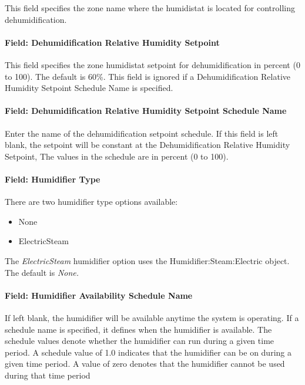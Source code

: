 This field specifies the zone name where the humidistat is located for controlling dehumidification.

\paragraph{Field: Dehumidification Relative Humidity Setpoint}\label{field-dehumidification-relative-humidity-setpoint-1}

This field specifies the zone humidistat setpoint for dehumidification in percent (0 to 100). The default is 60\%. This field is ignored if a Dehumidification Relative Humidity Setpoint Schedule Name is specified.

\paragraph{Field: Dehumidification Relative Humidity Setpoint Schedule Name}\label{field-dehumidification-relative-humidity-setpoint-schedule-name-1}

Enter the name of the dehumidification setpoint schedule. If this field is left blank, the setpoint will be constant at the Dehumidification Relative Humidity Setpoint, The values in the schedule are in percent (0 to 100).

\paragraph{Field: Humidifier Type}\label{field-humidifier-type-5}

There are two humidifier type options available:

\begin{itemize}
\item
  None
\item
  ElectricSteam
\end{itemize}

The \emph{ElectricSteam} humidifier option uses the Humidifier:Steam:Electric object. The default is \emph{None.}

\paragraph{Field: Humidifier Availability Schedule Name}\label{field-humidifier-availability-schedule-name-5}

If left blank, the humidifier will be available anytime the system is operating. If a schedule name is specified, it defines when the humidifier is available. The schedule values denote whether the humidifier can run during a given time period. A schedule value of 1.0 indicates that the humidifier can be on during a given time period. A value of zero denotes that the humidifier cannot be used during that time period


